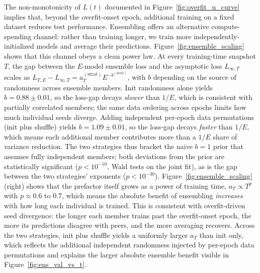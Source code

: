 The non-monotonicity of $L(t)$ documented in Figure~\ref{fig:overfit_u_curve} implies that, beyond the overfit-onset epoch, additional training on a fixed dataset reduces test performance.
Ensembling offers an alternative compute-spending channel: rather than training longer, we train more independently-initialized models and average their predictions.
Figure~\ref{fig:ensemble_scaling} shows that this channel obeys a clean power law.
At every training-time snapshot $T$, the gap between the $E$-model ensemble loss and the asymptotic loss $L_{\infty,T}$ scales as $L_{T,E} - L_{\infty,T} = a_T^{(\text{strat})} E^{-b^{(\text{strat})}}$, with $b$ depending on the source of randomness across ensemble members.
Init randomness alone yields $b = 0.88 \pm 0.01$, so the loss-gap decays \emph{slower} than $1/E$, which is consistent with partially correlated members; the same data ordering across epochs limits how much individual seeds diverge.
Adding independent per-epoch data permutations (init plus shuffle) yields $b = 1.09 \pm 0.01$, so the loss-gap decays \emph{faster} than $1/E$, which means each additional member contributes more than a $1/E$ share of variance reduction.
The two strategies thus bracket the naive $b = 1$ prior that assumes fully independent members; both deviations from the prior are statistically significant ($p < 10^{-10}$, Wald tests on the joint fit), as is the gap between the two strategies' exponents ($p < 10^{-30}$).
Figure~\ref{fig:ensemble_scaling} (right) shows that the prefactor itself grows as a power of training time, $a_T \propto T^{p}$ with $p \approx 0.6$ to $0.7$, which means the absolute benefit of ensembling \emph{increases} with how long each individual is trained.
This is consistent with overfit-driven seed divergence: the longer each member trains past the overfit-onset epoch, the more its predictions disagree with peers, and the more averaging recovers.
Across the two strategies, init plus shuffle yields a uniformly larger $a_T$ than init only, which reflects the additional independent randomness injected by per-epoch data permutations and explains the larger absolute ensemble benefit visible in Figure~\ref{fig:ens_val_vs_t}.

